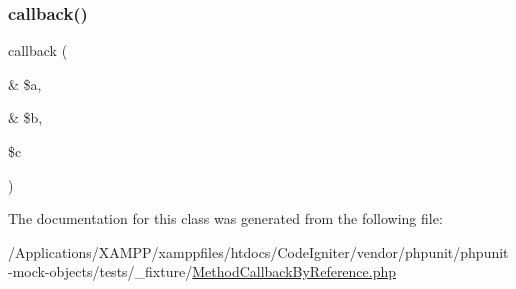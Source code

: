 \subsubsection{\texorpdfstring{callback()}{callback()}}
{\footnotesize\ttfamily callback (\begin{DoxyParamCaption}\item[{\&}]{\$a,  }\item[{\&}]{\$b,  }\item[{}]{\$c }\end{DoxyParamCaption})}



The documentation for this class was generated from the following file\+:\begin{DoxyCompactItemize}
\item 
/\+Applications/\+X\+A\+M\+P\+P/xamppfiles/htdocs/\+Code\+Igniter/vendor/phpunit/phpunit-\/mock-\/objects/tests/\+\_\+fixture/\mbox{\hyperlink{_method_callback_by_reference_8php}{Method\+Callback\+By\+Reference.\+php}}\end{DoxyCompactItemize}
